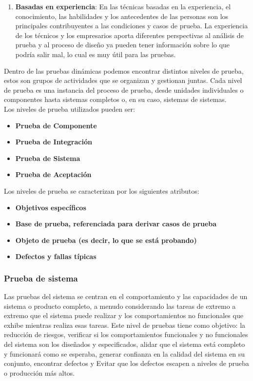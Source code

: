 \begin{enumerate}
	\item \textbf {Basadas en experiencia}: En las técnicas basadas en la experiencia, el conocimiento, las habilidades y los antecedentes de las personas son los principales contribuyentes a las condiciones y casos de prueba. La experiencia de los técnicos y los empresarios aporta diferentes perspectivas al análisis de prueba y al proceso de diseño ya pueden tener información sobre lo que podría salir mal, lo cual es muy útil para las pruebas.

\end{enumerate}

Dentro de las pruebas dinámicas podemos encontrar distintos niveles de prueba, estos son grupos de actividades que se organizan y gestionan juntas. Cada nivel de prueba es una instancia del proceso de prueba, desde unidades individuales o componentes hasta sistemas completos o, en su caso, sistemas de sistemas.\\

Los niveles de prueba utilizados pueden ser:

\begin{itemize}
	\item \textbf {Prueba de Componente}
	\item \textbf {Prueba de Integración}
	\item \textbf {Prueba de Sistema}
	\item \textbf {Prueba de Aceptación}
\end{itemize}

Los niveles de prueba se caracterizan por los siguientes atributos:

\begin{itemize}
	\item \textbf {Objetivos específicos}
	\item \textbf {Base de prueba, referenciada para derivar casos de prueba}
	\item \textbf {Objeto de prueba (es decir, lo que se está probando)}
	\item \textbf {Defectos y fallas típicas}
\end{itemize}

\subsubsection{Prueba de sistema}

Las pruebas del sistema se centran en el comportamiento y las capacidades de un sistema o producto completo, a menudo considerando las tareas de extremo a extremo que el sistema puede realizar y los comportamientos no funcionales que exhibe mientras realiza esas tareas. Este nivel de pruebas tiene como objetivo: la reducción de riesgos, verificar si los comportamientos funcionales y no funcionales del sistema son los diseñados y especificados, alidar que el sistema está completo y funcionará como se esperaba, generar confianza en la calidad del sistema en su conjunto, encontrar defectos y Evitar que los defectos escapen a niveles de prueba o producción más altos.

